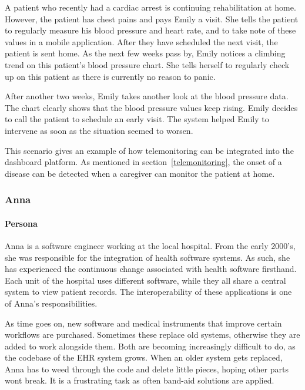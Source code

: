         A patient who recently had a cardiac arrest is continuing rehabilitation at home. However, the patient has chest pains and pays Emily a visit. She tells the patient to regularly measure his blood pressure and heart rate, and to take note of these values in a mobile application. After they have scheduled the next visit, the patient is sent home. As the next few weeks pass by, Emily notices a climbing trend on this patient's blood pressure chart. She tells herself to regularly check up on this patient as there is currently no reason to panic.
        
        After another two weeks, Emily takes another look at the blood pressure data. The chart clearly shows that the blood pressure values keep rising. Emily decides to call the patient to schedule an early visit. The system helped Emily to intervene as soon as the situation seemed to worsen.\bigskip

        \noindent This scenario gives an example of how telemonitoring can be integrated into the dashboard platform. As mentioned in section~\ref{telemonitoring}, the onset of a disease can be detected when a caregiver can monitor the patient at home.

        \subsubsection{Anna}

        \paragraph{Persona} Anna is a software engineer working at the local hospital. From the early 2000's, she was responsible for the integration of health software systems. As such, she has experienced the continuous change associated with health software firsthand. Each unit of the hospital uses different software, while they all share a central system to view patient records. The interoperability of these applications is one of Anna's responsibilities.

        As time goes on, new software and medical instruments that improve certain workflows are purchased. Sometimes these replace old systems, otherwise they are added to work alongside them. Both are becoming increasingly difficult to do, as the codebase of the EHR system grows. When an older system gets replaced, Anna has to weed through the code and delete little pieces, hoping other parts wont break. It is a frustrating task as often band-aid solutions are applied.


